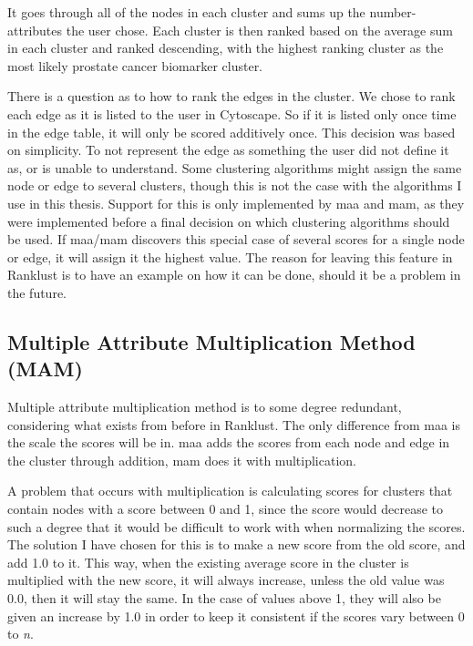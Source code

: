 It goes through all of the nodes in each cluster and sums up the number-
attributes the user chose. Each cluster is then ranked based on the average sum
in each cluster and ranked descending, with the highest ranking cluster as the
most likely prostate cancer biomarker cluster.

There is a question as to how to rank the edges in the cluster. We chose to rank
each edge as it is listed to the user in Cytoscape. So if it is listed only once
time in the edge table, it will only be scored additively once. This decision
was based on simplicity. To not represent the edge as something the user did not
define it as, or is unable to understand. Some clustering algorithms might
assign the same node or edge to several clusters, though this is not the case
with the algorithms I use in this thesis. Support for this is only implemented
by \gls{maa} and \gls{mam}, as they were implemented before a final decision on which
clustering algorithms should be used. If \gls{maa}/\gls{mam} discovers this special case of
several scores for a single node or edge, it will assign it the highest value.
The reason for leaving this feature in Ranklust is to have an example on how it
can be done, should it be a problem in the future.

\subsection{Multiple Attribute Multiplication Method (MAM)}
Multiple attribute multiplication method is to some degree redundant,
considering what exists from before in Ranklust. The only difference from \gls{maa} is
the scale the scores will be in. \gls{maa} adds the scores from each node and edge in
the cluster through addition, \gls{mam} does it with multiplication.

A problem that occurs with multiplication is calculating scores for clusters
that contain nodes with a score between 0 and 1, since the score would decrease
to such a degree that it would be difficult to work with when normalizing the
scores. The solution I have chosen for this is to make a new score from the
old score, and add 1.0 to it. This way, when the existing average score in the
cluster is multiplied with the new score, it will always increase, unless the
old value was 0.0, then it will stay the same. In the case of values above 1,
they will also be given an increase by 1.0 in order to keep it consistent if the
scores vary between 0 to \textit{n}. %

